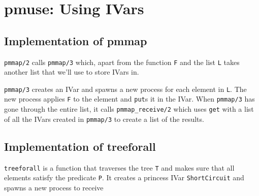 \documentclass [10pt,a4paper]{article}
\newcommand{\erlang}[1]{\texttt{#1}}
\begin{document}
\section{pmuse: Using IVars}

\subsection{Implementation of pmmap}

\erlang{pmmap/2} calls \erlang{pmmap/3} which, apart from the function
\erlang{F} and the list \erlang{L} takes another list that we'll use
to store IVars in.

\erlang{pmmap/3} creates an IVar and spawns a new process for each
element in \erlang{L}. The new process applies \erlang{F} to the
element and \erlang{put}s it in the IVar. When \erlang{pmmap/3} has
gone through the entire list, it calls \erlang{pmmap\_receive/2} which
uses \erlang{get} with a list of all the IVars created in
\erlang{pmmap/3} to create a list of the results.

\subsection{Implementation of treeforall}

\erlang{treeforall\2} is a function that traverses the tree \erlang{T}
and makes sure that all elements satisfy the predicate \erlang{P}. It
creates a princess IVar \erlang{ShortCircuit} and spawns a new process to receive 
\end{document}
